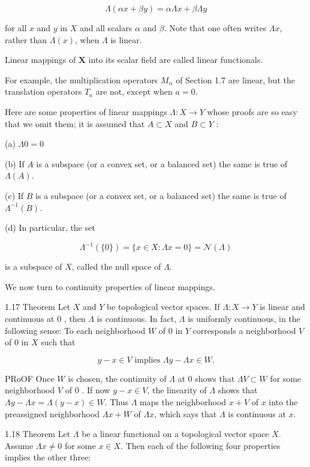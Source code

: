 \documentclass[10pt]{article}
\begin{document}
$$
\Lambda(\alpha x+\beta y)=\alpha \Lambda x+\beta \Lambda y
$$

for all $x$ and $y$ in $X$ and all scalars $\alpha$ and $\beta$. Note that one often writes $\Lambda x$, rather than $\Lambda(x)$, when $\Lambda$ is linear.

Linear mappings of $\boldsymbol{X}$ into its scalar field are called linear functionals.

For example, the multiplication operators $M_{\alpha}$ of Section 1.7 are linear, but the translation operators $T_{a}$ are not, except when $a=0$.

Here are some properties of linear mappings $\Lambda: X \rightarrow Y$ whose proofs are so easy that we omit them; it is assumed that $A \subset X$ and $B \subset Y$ :

(a) $\Lambda 0=0$

(b) If $A$ is a subspace (or a convex set, or a balanced set) the same is true of $\Lambda(A)$.

(c) If $B$ is a subspace (or a convex set, or a balanced set) the same is true of $\Lambda^{-1}(B)$.

(d) In particular, the set

$$
\Lambda^{-1}(\{0\})=\{x \in X: \Lambda x=0\}=\mathscr{N}(\Lambda)
$$

is a subspace of $X$, called the null space of $\Lambda$.

We now turn to continuity properties of linear mappings.

1.17 Theorem Let $X$ and $Y$ be topological vector spaces. If $\Lambda: X \rightarrow Y$ is linear and continuous at 0 , then $\Lambda$ is continuous. In fact, $\Lambda$ is uniformly continuous, in the following sense: To each neighborhood $W$ of 0 in $Y$ corresponds a neighborhood $V$ of 0 in $X$ such that

$$
y-x \in V \text { implies } \Lambda y-\Lambda x \in W .
$$

PRoOF Once $W$ is chosen, the continuity of $\Lambda$ at 0 shows that $\Lambda V \subset W$ for some neighborhood $V$ of 0 . If now $y-x \in V$, the linearity of $\Lambda$ shows that $\Lambda y-\Lambda x=\Lambda(y-x) \in W$. Thus $\Lambda$ maps the neighborhood $x+V$ of $x$ into the preassigned neighborhood $\Lambda x+W$ of $\Lambda x$, which says that $\Lambda$ is continuous at $x$.

1.18 Theorem Let $\Lambda$ be a linear functional on a topological vector space $X$. Assume $\Lambda x \neq 0$ for some $x \in X$. Then each of the following four properties implies the other three:
\end{document}
